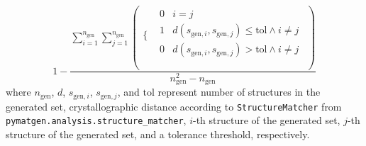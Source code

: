 \begin{equation} \label{eq:uniqueness}
	1-\frac{\sum _{i=1}^{n_{\text{gen}}} \sum _{j=1}^{n_{\text{gen}}} \left(
\begin{array}{cc}
 \{ &
\begin{array}{cc}
 0 & i=j \\
 1 & d\left(s_{\text{gen},i},s_{\text{gen},j}\right)\leq \text{tol}\land i\neq j \\
 0 & d\left(s_{\text{gen},i},s_{\text{gen},j}\right)>\text{tol}\land i\neq j \\
\end{array}
 \\
\end{array}
\right)}{n_{\text{gen}}^2-n_{\text{gen}}}
\end{equation}
where $n_{\text{gen}}$, $d$, $s_{\text{gen},i}$, $s_{\text{gen},j}$, and $\text{tol}$ represent number of structures in the generated set, crystallographic distance according to \texttt{StructureMatcher} from \texttt{pymatgen.analysis.structure\_matcher}, $i$-th structure of the generated set, $j$-th structure of the generated set, and a tolerance threshold, respectively.
